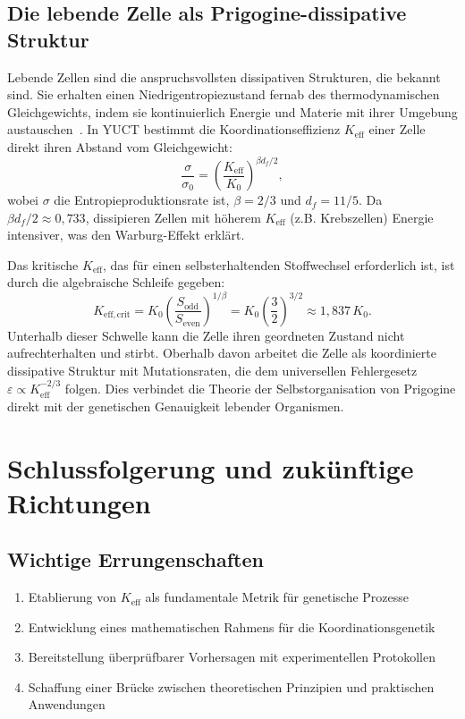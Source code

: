 \documentclass[12pt]{article}
\newcommand{\Keff}{K_{\mathrm{eff}}}
\begin{document}
	\subsection{Die lebende Zelle als Prigogine-dissipative Struktur}
	\label{subsec:prigogine}
	
	Lebende Zellen sind die anspruchsvollsten dissipativen Strukturen, die bekannt sind.
	Sie erhalten einen Niedrigentropiezustand fernab des thermodynamischen Gleichgewichts, indem sie kontinuierlich Energie und Materie mit ihrer Umgebung austauschen~\cite{Prigogine1977}.
	In YUCT bestimmt die Koordinationseffizienz $\Keff$ einer Zelle direkt
	ihren Abstand vom Gleichgewicht:
	\begin{equation}
		\frac{\sigma}{\sigma_0} = \left( \frac{\Keff}{K_0} \right)^{\beta d_f / 2},
	\end{equation}
	wobei $\sigma$ die Entropieproduktionsrate ist, $\beta=2/3$ und $d_f=11/5$.
	Da $\beta d_f / 2 \approx 0,733$, dissipieren Zellen mit höherem $\Keff$ (z.B.
	Krebszellen) Energie intensiver, was den Warburg-Effekt erklärt.
	
	Das kritische $\Keff$, das für einen selbsterhaltenden Stoffwechsel erforderlich ist, ist durch die algebraische Schleife gegeben:
	\begin{equation}
		K_{\mathrm{eff},\mathrm{crit}} = K_0 \left( \frac{S_{\mathrm{odd}}}{S_{\mathrm{even}}} \right)^{1/\beta}
		= K_0 \left( \frac{3}{2} \right)^{3/2} \approx 1,837\,K_0 .
	\end{equation}
	Unterhalb dieser Schwelle kann die Zelle ihren geordneten Zustand nicht aufrechterhalten und stirbt.
	Oberhalb davon arbeitet die Zelle als koordinierte dissipative Struktur mit
	Mutationsraten, die dem universellen Fehlergesetz $\varepsilon \propto \Keff^{-2/3}$ folgen.
	Dies verbindet die Theorie der Selbstorganisation von Prigogine direkt mit der
	genetischen Genauigkeit lebender Organismen.
	
	\section{Schlussfolgerung und zukünftige Richtungen}
	
	\subsection{Wichtige Errungenschaften}
	
	\begin{enumerate}
		\item Etablierung von $K_{\text{eff}}$ als fundamentale Metrik für genetische Prozesse
		\item Entwicklung eines mathematischen Rahmens für die Koordinationsgenetik
		\item Bereitstellung überprüfbarer Vorhersagen mit experimentellen Protokollen
		\item Schaffung einer Brücke zwischen theoretischen Prinzipien und praktischen Anwendungen
	\end{enumerate}
	
\end{document}
